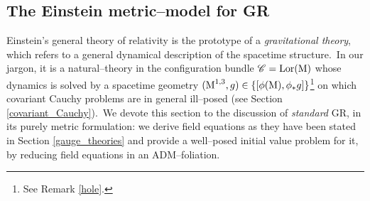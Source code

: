 

\subsection{The Einstein metric--model for GR}

Einstein's general theory of relativity is the prototype of a \emph{gravitational theory}, which refers to a general dynamical description of the spacetime structure.\, In our jargon, it is a natural--theory in the configuration bundle $\mathscr{C}=\text{\normalfont Lor}(\text{\normalfont M})$ whose dynamics is solved by a spacetime geometry $(\text{\normalfont M}^{1,3},g)\in\left\{\left[\phi(\text{\normalfont M}),\phi_*g\right]\right\}$\footnote{See Remark \ref{hole}.} on which covariant Cauchy problems are in general ill--posed (see Section \ref{covariant_Cauchy}).\, We devote this section to the discussion of \emph{standard} GR, in its purely metric formulation: we derive field equations as they have been stated in Section \ref{gauge_theories} and provide a well--posed initial value problem for it, by reducing field equations in an ADM--foliation.

